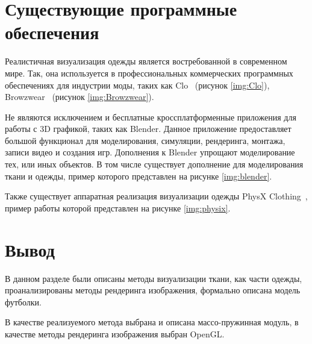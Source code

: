 \section{Существующие программные обеспечения}

Реалистичная визуализация одежды является востребованной в современном мире.
Так, она используется в профессиональных коммерческих программных обеспечениях
для индустрии моды, таких как Clo~\cite{site01} (рисунок \ref{img:Clo}),
Browzwear~\cite{site02} (рисунок \ref{img:Browzwear}).


Не являются исключением и бесплатные кроссплатформенные приложения для работы с
3D графикой, таких как Blender. Данное приложение предоставляет большой
функционал для моделирования, симуляции, рендеринга, монтажа, записи видео и
создания игр. Дополнения к Blender упрощают моделирование тех, или иных
объектов. В том числе существует дополнение для моделирования ткани и одежды,
пример которого представлен на рисунке \ref{img:blender}.


Также существует аппаратная реализация визуализации одежды PhysX
Clothing~\cite{site03}, пример работы которой представлен на рисунке
\ref{img:physix}.


\section*{Вывод}

В данном разделе были описаны методы визуализации ткани, как части
одежды, проанализированы методы рендеринга изображения, формально описана
модель футболки.

В качестве реализуемого метода выбрана и описана массо-пружинная модуль, в
качестве методы рендеринга изображения выбран OpenGL.
